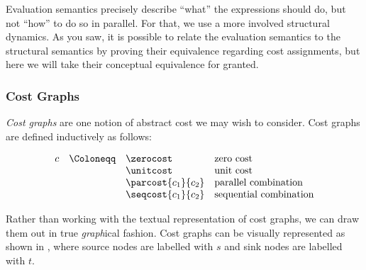Evaluation semantics precisely describe ``what'' the expressions should do, but not ``how'' to do
so in parallel. For that, we use a more involved structural dynamics. As you saw, it is possible to
relate the evaluation semantics to the structural semantics by proving their equivalence regarding
cost assignments, but here we will take their conceptual equivalence for granted.

\subsubsection{Cost Graphs}

\textit{Cost graphs} are one notion of abstract cost we may wish to consider.
Cost graphs are defined inductively as follows:

\[
  \begin{array}{r c l l}
    c & \Coloneqq & \zerocost          & \text{zero cost} \\
      &           & \unitcost          & \text{unit cost} \\
      &           & \parcost{c_1}{c_2} & \text{parallel combination} \\
      &           & \seqcost{c_1}{c_2} & \text{sequential combination} \\
  \end{array}
\]

Rather than working with the textual representation of cost graphs,
we can draw them out in true \textit{graph}ical fashion.
Cost graphs can be visually represented as shown in ,
where source nodes are labelled with $s$ and sink nodes are labelled with $t$.

